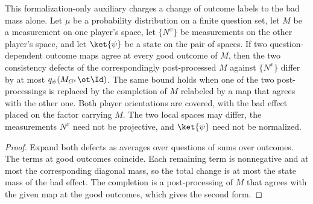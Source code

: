 	\begin{lemma}
		\label{lem:supported-completion-relabeling}
		\leanok
		This formalization-only auxiliary charges a change of outcome labels to
		the bad mass alone. Let $\mu$ be a probability distribution on a finite
		question set, let $M$ be a measurement on one player's space, let
		$\{N^x\}$ be measurements on the other player's space, and let
		$\ket{\psi}$ be a state on the pair of spaces. If two question-dependent
		outcome maps agree at every good outcome of $M$, then the two
		consistency defects of the correspondingly post-processed $M$ against
		$\{N^x\}$ differ by at most $q_\psi(M_{G^c} \ot \Id)$. The same bound
		holds when one of the two post-processings is replaced by the completion
		of $M$ relabeled by a map that agrees with the other one. Both player
		orientations are covered, with the bad effect placed on the factor
		carrying $M$. The two local spaces may differ, the measurements $N^x$
		need not be projective, and $\ket{\psi}$ need not be normalized.
	\end{lemma}
	\begin{proof}
		\leanok
		Expand both defects as averages over questions of sums over outcomes.
		The terms at good outcomes coincide. Each remaining term is nonnegative
		and at most the corresponding diagonal mass, so the total change is at
		most the state mass of the bad effect. The completion is a
		post-processing of $M$ that agrees with the given map at the good
		outcomes, which gives the second form.
	\end{proof}

